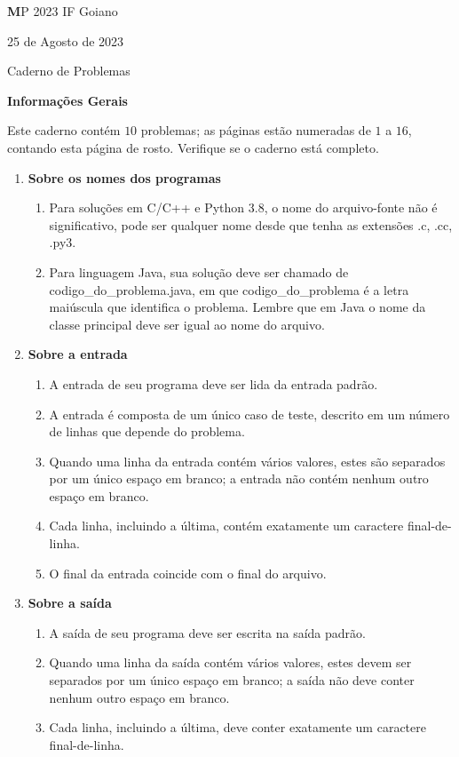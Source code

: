 
\rhead{\thepage}
\chead{}
\lfoot{}
\cfoot{}
\rfoot{}
\pagestyle{fancy}
\setlength{\headheight}{15pt}

\thispagestyle{empty}

\begin{center}
 {\large {\textbf 
MP 2023 IF Goiano}}


{\large 25 de Agosto de 2023}

{\large  Caderno de Problemas}

{\large \textbf{Informações Gerais}}
\end{center}

Este caderno contém $10$ problemas; as páginas estão numeradas de $1$ a $16$,  contando esta página de rosto. Verifique se o caderno está completo.

\begin{enumerate}
    \item \textbf{Sobre os nomes dos programas}
    \begin{enumerate}
        \item Para soluções em C/C++ e Python 3.8, o nome do arquivo-fonte não é significativo, pode ser qualquer nome desde que tenha as extensões .c, .cc, .py3.
        \item Para linguagem Java, sua solução deve ser chamado de codigo\_do\_problema.java, em que codigo\_do\_problema é a letra maiúscula que identifica o problema. Lembre que em Java o nome da classe principal deve ser igual ao nome do arquivo.
    \end{enumerate}
    \item \textbf{Sobre a entrada}
    \begin{enumerate}
        \item A entrada de seu programa deve ser lida da entrada padrão.
        \item A entrada é composta de um único caso de teste, descrito em um número de linhas que depende do problema.
        \item Quando uma linha da entrada contém vários valores, estes são separados por um único espaço em branco; a entrada não contém nenhum outro espaço em branco.
        \item Cada linha, incluindo a última, contém exatamente um caractere final-de-linha.
        \item O final da entrada coincide com o final do arquivo.
    \end{enumerate}
    \item \textbf{Sobre a saída}
    \begin{enumerate}
        \item A saída de seu programa deve ser escrita na saída padrão.
        \item Quando uma linha da saída contém vários valores, estes devem ser separados por um único espaço em branco; a saída não deve conter nenhum outro espaço em branco.
        \item Cada linha, incluindo a última, deve conter exatamente um caractere final-de-linha.
    \end{enumerate}
\end{enumerate}

\newpage

